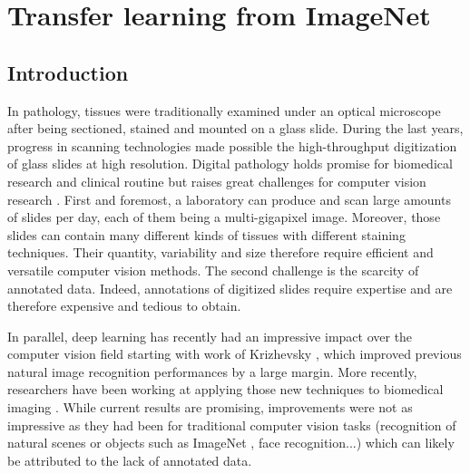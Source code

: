 \chapter{Transfer learning from ImageNet}




\section{Introduction}

In pathology, tissues were traditionally examined under an optical microscope after being sectioned, stained and mounted on a glass slide. During the last years, progress in scanning technologies made possible the high-throughput digitization of glass slides at high resolution. Digital pathology holds promise for biomedical research and clinical routine but raises great challenges for computer vision research \parencite{automated-histology-signal-proc-2014}. 
First and foremost, a laboratory can produce and scan large amounts of slides per day, each of them being a multi-gigapixel image. Moreover, those slides can contain many different kinds of tissues with different staining techniques. Their quantity, variability and size therefore require efficient and versatile computer vision methods. The second challenge is the scarcity of annotated data. Indeed, annotations of digitized slides require expertise and are therefore expensive and tedious to obtain.

In parallel, deep learning has recently had an impressive impact over the computer vision field starting with work of Krizhevsky \etal \parencite{krizhevsky2012imagenet}, which improved previous natural image recognition performances by a large margin. More recently, researchers have been working at applying those new techniques to biomedical imaging \parencite{greenspan2016guest,litjens2017survey}. While current results are promising, improvements were not as impressive as they had been for traditional computer vision tasks (recognition of natural scenes or objects such as ImageNet \parencite{deng2009imagenet}, face recognition...) which can likely be attributed to the lack of annotated data.


